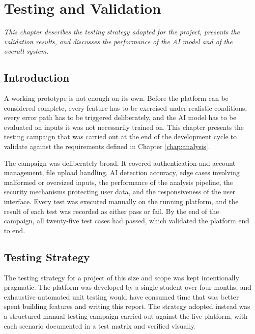 
\chapter{Testing and Validation}
\label{chap:testing}

\textit{This chapter describes the testing strategy adopted for the project, presents the validation results, and discusses the performance of the AI model and of the overall system.}

\vspace{0.8cm}

\section{Introduction}

A working prototype is not enough on its own. Before the platform can be considered complete, every feature has to be exercised under realistic conditions, every error path has to be triggered deliberately, and the AI model has to be evaluated on inputs it was not necessarily trained on. This chapter presents the testing campaign that was carried out at the end of the development cycle to validate \deepguard{} against the requirements defined in Chapter \ref{chap:analysis}.

The campaign was deliberately broad. It covered authentication and account management, file upload handling, AI detection accuracy, edge cases involving malformed or oversized inputs, the performance of the analysis pipeline, the security mechanisms protecting user data, and the responsiveness of the user interface. Every test was executed manually on the running platform, and the result of each test was recorded as either pass or fail. By the end of the campaign, all twenty-five test cases had passed, which validated the platform end to end.

\section{Testing Strategy}

The testing strategy for a project of this size and scope was kept intentionally pragmatic. The platform was developed by a single student over four months, and exhaustive automated unit testing would have consumed time that was better spent building features and writing this report. The strategy adopted instead was a structured manual testing campaign carried out against the live platform, with each scenario documented in a test matrix and verified visually.

